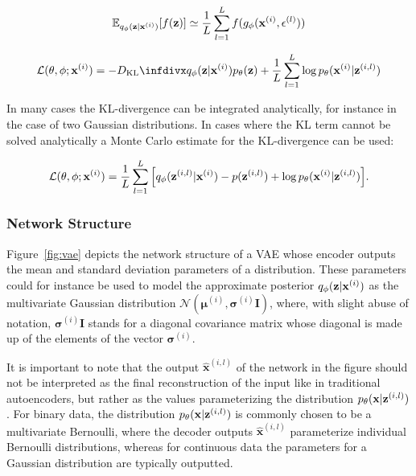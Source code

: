 $$\mathbb{E}_{q_{\mathbf{\phi}}(\mathbf{z} \vert \mathbf{x}^{(i)})}[f(\mathbf{z})] \simeq \frac{1}{L} \sum_{l=1}^{L} f(g_{\mathbf{\phi}}(\mathbf{x}^{(i)}, \mathbf{\epsilon}^{(l)}))$$

$$\mathcal{L}(\btheta, \bphi; \bxi) = -\dkl{\qphi(\bz \vert \bxi)}{\ptheta(\bz)} + \frac{1}{L} \sum_{l=1}^{L} \log \ptheta(\bxi \vert \mathbf{z}^{(i,l)})$$

In many cases the KL-divergence can be integrated analytically, for instance in the case of two Gaussian distributions. In cases where the KL term cannot be solved analytically a Monte Carlo estimate for the KL-divergence can be used:

$$\mathcal{L}(\mathbf{\theta}, \mathbf{\phi}; \mathbf{x}^{(i)}) = \frac{1}{L} \sum_{l=1}^{L} \Big[q_{\mathbf{\phi}}(\mathbf{z}^{(i,l)} \vert \mathbf{x}^{(i)}) - p(\mathbf{z}^{(i,l)}) + \log p_{\mathbf{\theta}}(\mathbf{x}^{(i)} \vert \mathbf{z}^{(i,l)})\Big].$$


\subsubsection{Network Structure}

Figure~\ref{fig:vae} depicts the network structure of a VAE whose encoder outputs the mean and standard deviation parameters of a distribution. These parameters could for instance be used to model the approximate posterior $q_{\mathbf{\phi}}(\mathbf{z} \vert \mathbf{x}^{(i)})$ as the multivariate Gaussian distribution $\mathcal{N}(\mathbf{\mu}^{(i)}, \mathbf{\sigma}^{(i)} \mathbf{I})$, where, with slight abuse of notation, $\mathbf{\sigma}^{(i)} \mathbf{I}$ stands for a diagonal covariance matrix whose diagonal is made up of the elements of the vector $\mathbf{\sigma}^{(i)}$.

It is important to note that the output $\hat{\mathbf{x}}^{(i,l)}$ of the network in the figure should not be interpreted as the final reconstruction of the input like in traditional autoencoders, but rather as the values parameterizing the distribution $p_{\mathbf{\theta}}(\mathbf{x} \vert \mathbf{z}^{(i, l)})$. For binary data, the distribution $p_{\mathbf{\theta}}(\mathbf{x} \vert \mathbf{z}^{(i, l)})$ is commonly chosen to be a multivariate Bernoulli, where the decoder outputs $\hat{\mathbf{x}}^{(i,l)}$ parameterize individual Bernoulli distributions, whereas for continuous data the parameters for a Gaussian distribution are typically outputted.

